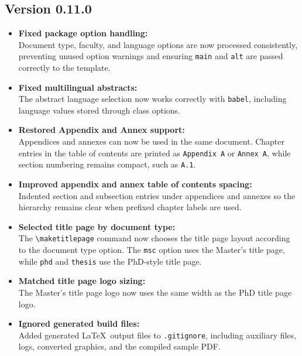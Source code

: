 \subsection{Version 0.11.0}
\begin{itemize}
\item \textbf{Fixed package option handling:}\\
Document type, faculty, and language options are now processed consistently, preventing unused option warnings and ensuring \texttt{main} and \texttt{alt} are passed correctly to the template.

\item \textbf{Fixed multilingual abstracts:}\\
The abstract language selection now works correctly with \texttt{babel}, including language values stored through class options.

\item \textbf{Restored Appendix and Annex support:}\\
Appendices and annexes can now be used in the same document. Chapter entries in the table of contents are printed as \texttt{Appendix A} or \texttt{Annex A}, while section numbering remains compact, such as \texttt{A.1}.

\item \textbf{Improved appendix and annex table of contents spacing:}\\
Indented section and subsection entries under appendices and annexes so the hierarchy remains clear when prefixed chapter labels are used.

\item \textbf{Selected title page by document type:}\\
The \verb|\maketitlepage| command now chooses the title page layout according to the document type option. The \texttt{msc} option uses the Master's title page, while \texttt{phd} and \texttt{thesis} use the PhD-style title page.

\item \textbf{Matched title page logo sizing:}\\
The Master's title page logo now uses the same width as the PhD title page logo.

\item \textbf{Ignored generated build files:}\\
Added generated \LaTeX\ output files to \texttt{.gitignore}, including auxiliary files, logs, converted graphics, and the compiled sample PDF.
\end{itemize}

